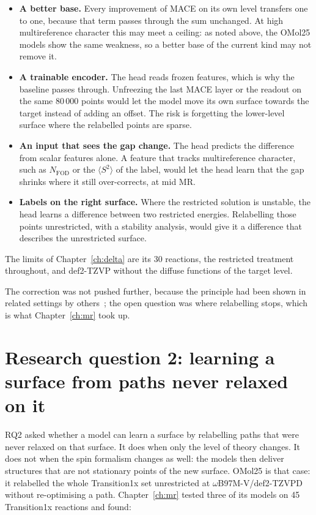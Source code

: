 \begin{itemize}
  \item \textbf{A better base.} Every improvement of MACE on its own
    level transfers one to one, because that term passes through the
    sum unchanged. At high multireference character this may meet a
    ceiling: as noted above, the OMol25 models show the same weakness,
    so a better base of the current kind may not remove it.
  \item \textbf{A trainable encoder.} The head reads frozen features,
    which is why the baseline passes through. Unfreezing the last MACE
    layer or the readout on the same 80\,000 points would let the model
    move its own surface towards the target instead of adding an
    offset. The risk is forgetting the lower-level surface where the
    relabelled points are sparse.
  \item \textbf{An input that sees the gap change.} The head predicts
    the difference from scalar features alone. A feature that tracks
    multireference character, such as $N_\text{FOD}$ or the
    $\langle S^2 \rangle$ of the label, would let the head learn that
    the gap shrinks where it still over-corrects, at mid MR.
  \item \textbf{Labels on the right surface.} Where the restricted
    solution is unstable, the head learns a difference between two
    restricted energies. Relabelling those points unrestricted, with a
    stability analysis, would give it a difference that describes the
    unrestricted surface.
\end{itemize}

The limits of Chapter~\ref{ch:delta} are its 30 reactions, the restricted
treatment throughout, and def2-TZVP without the diffuse functions of
the target level.

The correction was not pushed further, because the principle had been
shown in related settings by others~\cite{allen2026, ren2026}; the open question
was where relabelling stops, which is what Chapter~\ref{ch:mr} took up.

\section{Research question 2: learning a surface from paths never relaxed on it}

RQ2 asked whether a model can learn a surface by relabelling paths
that were never relaxed on that surface. It does when only the level
of theory changes. It does not when the spin formalism changes as
well: the models then deliver structures that are not stationary
points of the new surface. OMol25 is
that case: it relabelled the whole Transition1x set unrestricted at
\mbox{$\omega$B97M-V/def2-TZVPD} without re-optimising a path.
Chapter~\ref{ch:mr} tested three of its models on 45 Transition1x
reactions and found:


